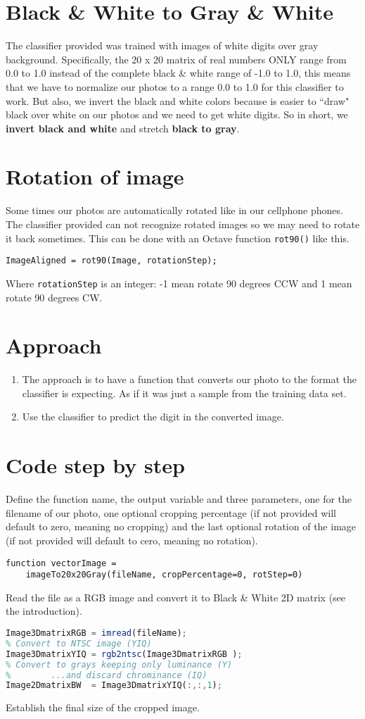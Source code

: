 \section{Black \& White to Gray \& White}
The classifier provided was trained with images of white digits over gray background. Specifically, the 20 x 20 matrix of real numbers ONLY range from 0.0 to 1.0 instead of the complete black \& white range of -1.0 to 1.0, this means that we have to normalize our photos to a range 0.0 to 1.0 for this classifier to work. But also, we invert the black and white colors because is easier to ``draw" black over white on our photos and we need to get white digits. So in short, we \textbf{invert black and white} and stretch \textbf{black to gray}.
\section{Rotation of image}
Some times our photos are automatically rotated like in our cellphone phones. The classifier provided can not recognize rotated images so we may need to rotate it back sometimes. This can be done with an Octave function \verb|rot90()| like this.
\begin{verbatim}
ImageAligned = rot90(Image, rotationStep);
\end{verbatim}
Where \verb|rotationStep| is an integer: -1 mean rotate 90 degrees CCW and 1 mean rotate 90 degrees CW.
\section{Approach}
\begin{enumerate}
	\item The approach is to have a function that converts our photo to the format the classifier is expecting. As if it was just a sample from the training data set.
	\item Use the classifier to predict the digit in the converted image.
\end{enumerate}
\section{Code step by step}
Define the function name, the output variable and three parameters, one for the filename of our photo, one optional cropping percentage (if not provided will default to zero, meaning no cropping) and the last optional rotation of the image (if not provided will default to cero, meaning no rotation).
\begin{verbatim}
function vectorImage = 
	imageTo20x20Gray(fileName, cropPercentage=0, rotStep=0)
\end{verbatim}
Read the file as a RGB image and convert it to Black \& White 2D matrix (see the introduction).
\begin{lstlisting}[language=Octave]
% Read as RGB image
Image3DmatrixRGB = imread(fileName);
% Convert to NTSC image (YIQ)
Image3DmatrixYIQ = rgb2ntsc(Image3DmatrixRGB );
% Convert to grays keeping only luminance (Y)
%        ...and discard chrominance (IQ)
Image2DmatrixBW  = Image3DmatrixYIQ(:,:,1);
\end{lstlisting}
Establish the final size of the cropped image.

